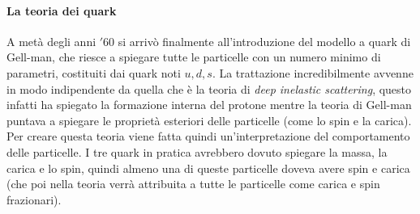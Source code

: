 \paragraph{La teoria dei quark}
A metà degli anni $'60$ si arrivò finalmente all'introduzione del modello a quark di Gell-man, che riesce a spiegare tutte le particelle con un numero minimo di parametri, costituiti dai quark noti $u, d, s$.
La trattazione incredibilmente avvenne in modo indipendente da quella che è la teoria di \emph{deep inelastic scattering}, questo infatti ha spiegato la formazione interna del protone mentre la teoria di Gell-man puntava a spiegare le proprietà esteriori delle particelle (come lo spin e la carica).
Per creare questa teoria viene fatta quindi un'interpretazione del comportamento delle particelle.
I tre quark in pratica avrebbero dovuto spiegare la massa, la carica e lo spin, quindi almeno una di queste particelle doveva avere spin e carica (che poi nella teoria verrà attribuita a tutte le particelle come carica e spin frazionari).


